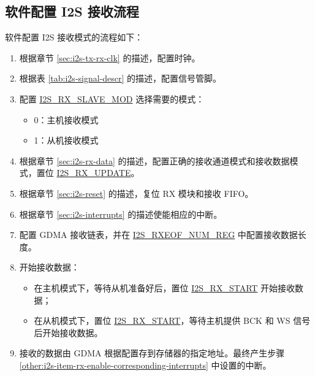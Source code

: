 \documentclass[main\_\_CN.tex]{subfiles}
\begin{document}
\subsection{软件配置 I2S 接收流程}\label{sec:i2s-configure-i2s-rx-mode}

软件配置 I2S 接收模式的流程如下：

\begin{enumerate}
    \item 根据章节 \ref{sec:i2s-tx-rx-clk} \textit{} 的描述，配置时钟。
    \item 根据表 \ref{tab:i2s-signal-descr} \textit{} 的描述，配置信号管脚。
    \item 配置 \hyperref[fielddesc:I2SRXSLAVEMOD]{I2S\_RX\_SLAVE\_MOD} 选择需要的模式：
    \begin{itemize}
        \item 0：主机接收模式
        \item 1：从机接收模式
    \end{itemize}
    \item 根据章节 \ref{sec:i2s-rx-data} \textit{} 的描述，配置正确的接收通道模式和接收数据模式，置位 \hyperref[fielddesc:I2SRXUPDATE]{I2S\_RX\_UPDATE}。
    \item 根据章节 \ref{sec:i2s-reset} \textit{} 的描述，复位 RX 模块和接收 FIFO。
    \item 根据章节 \ref{sec:i2s-interrupts} \textit{} 的描述使能相应的中断。\label{other:i2s-item-rx-enable-corresponding-interrupts}
    \item 配置 GDMA 接收链表，并在 \hyperref[regdesc:I2SRXEOFNUMREG]{I2S\_RXEOF\_NUM\_REG} 中配置接收数据长度。
    \item 开始接收数据：
    \begin{itemize}
        \item 在主机模式下，等待从机准备好后，置位 \hyperref[fielddesc:I2SRXSTART]{I2S\_RX\_START} 开始接收数据；
        \item 在从机模式下，置位 \hyperref[fielddesc:I2SRXSTART]{I2S\_RX\_START}，等待主机提供 BCK 和 WS 信号后开始接收数据。
    \end{itemize}
    \item 接收的数据由 GDMA 根据配置存到存储器的指定地址。最终产生步骤 \ref{other:i2s-item-rx-enable-corresponding-interrupts} 中设置的中断。
\end{enumerate}


\end{document}
